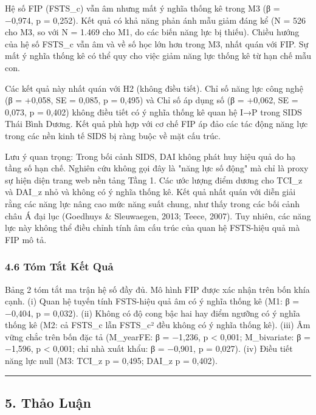 \documentclass[12pt,a4paper]{article}
\begin{document}
Hệ số FIP (FSTS\_c) vẫn âm nhưng mất ý nghĩa thống kê trong M3 (β =
−0,974, p = 0,252). Kết quả có khả năng phản ánh mẫu giảm đáng kể (N =
526 cho M3, so với N = 1.469 cho M1, do các biến năng lực bị thiếu).
Chiều hướng của hệ số FSTS\_c vẫn âm và về số học lớn hơn trong M3, nhất
quán với FIP. Sự mất ý nghĩa thống kê có thể quy cho việc giảm năng lực
thống kê từ hạn chế mẫu con.

Các kết quả này nhất quán với H2 (không điều tiết). Chỉ số năng lực công
nghệ (β = +0,058, SE = 0,085, p = 0,495) và Chỉ số áp dụng số (β =
+0,062, SE = 0,073, p = 0,402) không điều tiết có ý nghĩa thống kê quan
hệ I→P trong SIDS Thái Bình Dương. Kết quả phù hợp với cơ chế FIP áp đảo
các tác động năng lực trong các nền kinh tế SIDS bị ràng buộc về mặt cấu
trúc.

Lưu ý quan trọng: Trong bối cảnh SIDS, DAI không phát huy hiệu quả do hạ
tầng số hạn chế. Nghiên cứu không gọi đây là "năng lực số động" mà chỉ
là proxy sự hiện diện trang web nền tảng Tầng 1. Các ước lượng điểm
dương cho TCI\_z và DAI\_z nhỏ và không có ý nghĩa thống kê. Kết quả
nhất quán với diễn giải rằng các năng lực nâng cao mức năng suất chung,
như thấy trong các bối cảnh châu Á đại lục (Goedhuys \& Sleuwaegen,
2013; Teece, 2007). Tuy nhiên, các năng lực này không thể điều chỉnh
tính âm cấu trúc của quan hệ FSTS-hiệu quả mà FIP mô tả.

\hypertarget{46-tuxf3m-tux1eaft-kux1ebft-quux1ea3}{%
\subsubsection{4.6 Tóm Tắt Kết
Quả}\label{46-tuxf3m-tux1eaft-kux1ebft-quux1ea3}}

Bảng 2 tóm tắt ma trận hệ số đầy đủ. Mô hình FIP được xác nhận trên bốn
khía cạnh. (i) Quan hệ tuyến tính FSTS-hiệu quả âm có ý nghĩa thống kê
(M1: β = −0,404, p = 0,032). (ii) Không có độ cong bậc hai hay điểm
ngưỡng có ý nghĩa thống kê (M2: cả FSTS\_c lẫn FSTS\_c² đều không có ý
nghĩa thống kê). (iii) Âm vững chắc trên bốn đặc tả (M\_yearFE: β =
−1,236, p \textless{} 0,001; M\_bivariate: β = −1,596, p \textless{}
0,001; chỉ nhà xuất khẩu: β = −0,901, p = 0,027). (iv) Điều tiết năng
lực null (M3: TCI\_z p = 0,495; DAI\_z p = 0,402).

\begin{center}\rule{0.5\linewidth}{0.5pt}\end{center}

\hypertarget{5-thux1ea3o-luux1eadn}{%
\subsection{5. Thảo Luận}\label{5-thux1ea3o-luux1eadn}}
\end{document}
